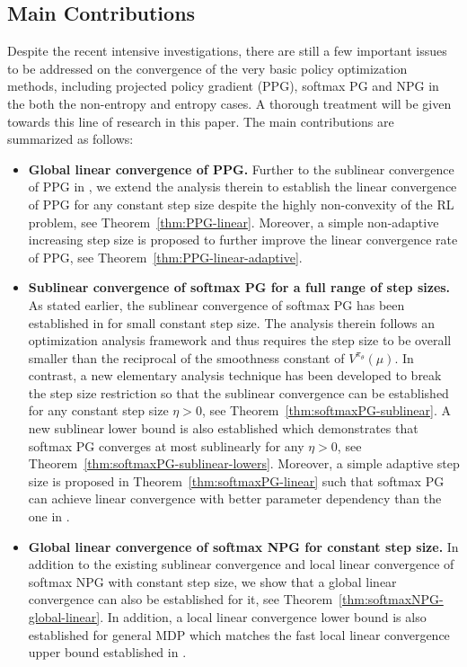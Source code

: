 \subsection{Main Contributions}
Despite the recent intensive investigations, there are still a few important issues to be addressed on the convergence of the very basic policy optimization methods, including projected policy gradient (PPG), softmax PG and NPG in the both the non-entropy and entropy cases.
A thorough treatment will be  given towards this line of research in this paper. The main contributions are summarized as follows:
\begin{itemize}
    \item \textbf{Global linear convergence of PPG.} Further to the sublinear convergence of PPG in \cite{ppgliu}, we extend the analysis therein to  establish the linear convergence of PPG for any constant step size despite the highly non-convexity of the RL problem, see Theorem~\ref{thm:PPG-linear}. Moreover,  a simple non-adaptive increasing step size is proposed to further improve the linear convergence rate of PPG, see Theorem~\ref{thm:PPG-linear-adaptive}.
    \item \textbf{Sublinear convergence of softmax PG for a full range of step sizes.} 
    As stated earlier, the sublinear convergence of softmax PG has been established in \cite{Mei_Xiao_Szepesvari_Schuurmans_2020} for small constant step size. The analysis therein follows an optimization analysis framework and thus requires the step size to be overall smaller than the reciprocal of the smoothness constant of $V^{\pi_\theta}(\mu)$. In contrast, a new elementary analysis technique has been developed to break the step size restriction so that the sublinear convergence can be established for any constant step size $\eta>0$, see Theorem~\ref{thm:softmaxPG-sublinear}.
    A new sublinear lower bound is also established which demonstrates that softmax PG converges at most sublinearly for any $\eta>0$, see Theorem~\ref{thm:softmaxPG-sublinear-lowers}. {Moreover, a simple adaptive step size  is proposed in Theorem~\ref{thm:softmaxPG-linear} such that softmax PG can achieve linear convergence with better parameter dependency than the one in \cite{mei2021normalized}.}
    \item \textbf{Global linear convergence of softmax NPG for constant step size.}
    In addition to the existing sublinear convergence \cite{Agarwal_Kakade_Lee_Mahajan_2019} and local linear convergence \cite{Xiao_2022} of softmax NPG with constant step size, we show that a global linear convergence can also be established for it, see Theorem~\ref{thm:softmaxNPG-global-linear}.  In addition, a local linear convergence lower bound is also established for general MDP which matches the fast local linear convergence upper bound established in \cite{Khodadadian_Jhunjhunwala_Varma_Maguluri_2021}.

\end{itemize}
